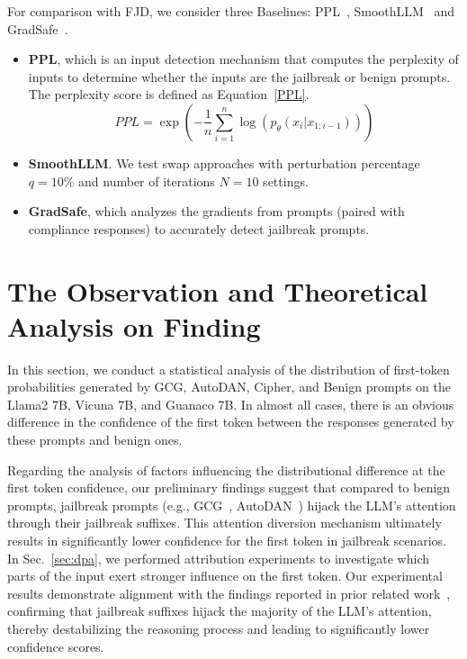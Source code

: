 \documentclass{article}
\begin{document}
For comparison with FJD, we consider three Baselines: PPL~\citep{alon2023detecting}, SmoothLLM~\citep{robey2023smoothllm} and GradSafe~\citep{xie2024gradsafe}.
\begin{itemize} 
    \item \textbf{PPL}, which is an input detection mechanism that computes the perplexity of inputs to determine whether the inputs are the jailbreak or benign prompts. The perplexity score is defined as Equation~\ref{PPL}.
    \begin{equation}
        \label{PPL}
        PPL=\exp (-\frac{1}{n} \sum_{i=1}^n \log(p_{\theta}(x_i|x_{1:i-1})))
    \end{equation}

    \item \textbf{SmoothLLM}. We test swap approaches with perturbation percentage $q = 10\%$ and number of iterations $N = 10$ settings.

    \item \textbf{GradSafe}, which analyzes the gradients from prompts (paired with compliance responses) to accurately detect jailbreak prompts.

    
\end{itemize}

\section{The Observation and Theoretical Analysis on Finding}\label{app:observ}

In this section, we conduct a statistical analysis of the distribution of first-token probabilities generated by GCG, AutoDAN, Cipher, and Benign prompts on the Llama2 7B, Vicuna 7B, and Guanaco 7B. In almost all cases, there is an obvious difference in the confidence of the first token between the responses generated by these prompts and benign ones.

Regarding the analysis of factors influencing the distributional difference at the first token confidence, our preliminary findings suggest that compared to benign prompts, jailbreak prompts (e.g., GCG~\citep{zou2023universal}, AutoDAN~\citep{liu2023autodan}) hijack the LLM's attention through their jailbreak suffixes. This attention diversion mechanism ultimately results in significantly lower confidence for the first token in jailbreak scenarios. In Sec.~\ref{sec:dpa}, we performed attribution experiments to investigate which parts of the input exert stronger influence on the first token. Our experimental results demonstrate alignment with the findings reported in prior related work~\citep{arditi2024refusal}, confirming that jailbreak suffixes hijack the majority of the LLM’s attention, thereby destabilizing the reasoning process and leading to significantly lower confidence scores.
\end{document}
